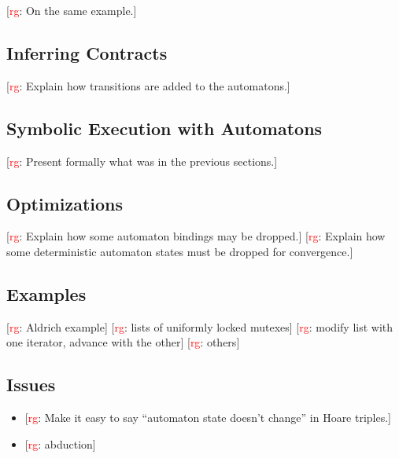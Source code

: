 \documentclass[a4paper]{article}
\newcommand{\todo}[2]{{\small [\textcolor{red}{#1}: #2]}}
\newcommand{\rg}[1]{\todo{rg}{#1}}
\theoremstyle{remark}
\begin{document}
\rg{On the same example.}

\subsection{Inferring Contracts}\label{sec:infer} %

\rg{Explain how transitions are added to the automatons.}

\subsection{Symbolic Execution with Automatons}\label{sec:formal} %

\rg{Present formally what was in the previous sections.}

\subsection{Optimizations}\label{sec:optimizations} %

\rg{Explain how some automaton bindings may be dropped.}
\rg{Explain how some deterministic automaton states must be dropped for convergence.}

\subsection{Examples}\label{sec:example} %

\rg{Aldrich example}
\rg{lists of uniformly locked mutexes}
\rg{modify list with one iterator, advance with the other}
\rg{others}

\subsection{Issues}\label{sec:issues} %

\begin{itemize}
\item \rg{Make it easy to say ``automaton state doesn't change'' in Hoare triples.}
\item \rg{abduction}
\end{itemize}



\end{document}
